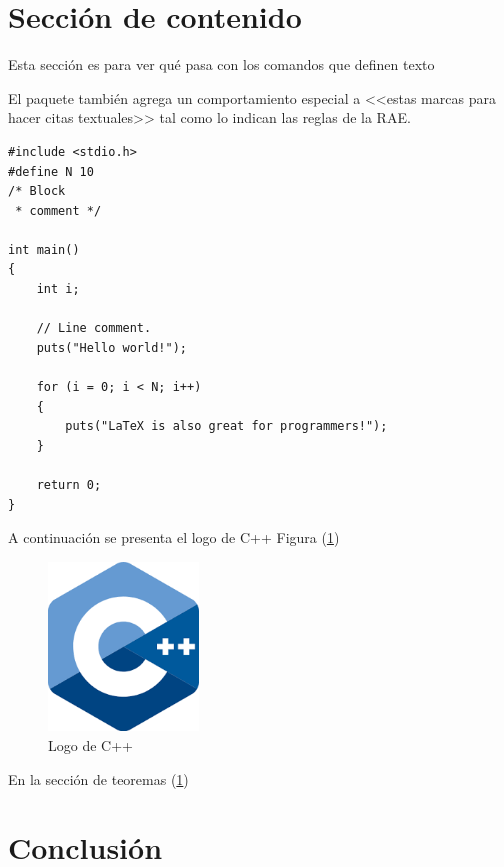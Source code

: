 \documentclass{article}
\begin{document}
\section{Sección de contenido} \label{contenido}

Esta sección es para ver qué pasa con los comandos 
que definen texto

El paquete también agrega un comportamiento especial 
a <<estas marcas para hacer citas textuales>> tal como 
lo indican las reglas de la RAE. \cite{dirac}

\begin{lstlisting}
#include <stdio.h>
#define N 10
/* Block
 * comment */

int main()
{
    int i;

    // Line comment.
    puts("Hello world!");
    
    for (i = 0; i < N; i++)
    {
        puts("LaTeX is also great for programmers!");
    }

    return 0;
}
\end{lstlisting}

A continuación se presenta el logo de C++ Figura (\ref{fig:cpplogo})

\begin{figure}[h]
\includegraphics[width=4cm]{cpplogo.png}
\centering
\caption{Logo de C++}
\label{fig:cpplogo}
\end{figure}

En la sección de teoremas (\ref{contenido})

\section{Conclusión} \label{conclulsion}



\end{document}
